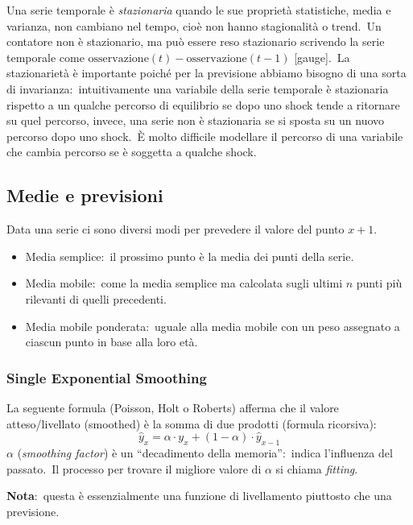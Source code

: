 Una serie temporale è \textit{stazionaria} quando le sue proprietà statistiche, media e varianza, non cambiano nel tempo, cioè non hanno stagionalità o trend.\
Un contatore non è stazionario, ma può essere reso stazionario scrivendo la serie temporale come $\mathrm{osservazione}(t) - \mathrm{osservazione}(t-1)$ [gauge].\
La stazionarietà è importante poiché per la previsione abbiamo bisogno di una sorta di invarianza:\ intuitivamente una variabile della serie temporale è stazionaria rispetto a un qualche percorso di equilibrio se dopo uno shock tende a ritornare su quel percorso, invece, una serie non è stazionaria se si sposta su un nuovo percorso dopo uno shock.\
È molto difficile modellare il percorso di una variabile che cambia percorso se è soggetta a qualche shock.

\subsection{Medie e previsioni}

Data una serie ci sono diversi modi per prevedere il valore del punto $x+1$.\
\begin{itemize}
    \item Media semplice:\ il prossimo punto è la media dei punti della serie.
    \item Media mobile:\ come la media semplice ma calcolata sugli ultimi $n$ punti più rilevanti di quelli precedenti.
    \item Media mobile ponderata:\ uguale alla media mobile con un peso assegnato a ciascun punto in base alla loro età.
\end{itemize}

\subsubsection{Single Exponential Smoothing}

La seguente formula (Poisson, Holt o Roberts) afferma che il valore atteso/livellato (smoothed) è la somma di due prodotti (formula ricorsiva):
\[\hat{y}_x = \alpha\cdot y_x + (1-\alpha)\cdot \hat{y}_{x-1}\]
$\alpha$ (\textit{smoothing factor}) è un ``decadimento della memoria'':\ indica l'influenza del passato.\
Il processo per trovare il migliore valore di $\alpha$ si chiama \textit{fitting}.\

\vspace{12pt}
\noindent\textbf{Nota}:\ questa è essenzialmente una funzione di livellamento piuttosto che una previsione.\

